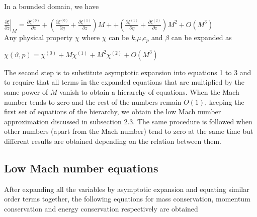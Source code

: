 \documentclass[11pt,a4paper]{article}
\begin{document}
In a bounded domain, we have

$\left. \frac{\partial \xi}{\partial z} \right|_M = \frac{\partial \xi^{(0)}}{\partial z} +\left(\frac{\partial \xi^{(0)}}{\partial\eta}+\frac{\partial\xi^{(1)}}{\partial z}\right)M+ +\left(\frac{\partial \xi^{(1)}}{\partial\eta}+\frac{\partial\xi^{(2)}}{\partial z}\right)M^2+O(M^3)$\\
Any physical property $\chi$ where $\chi$ can be $k$,$\mu$,$c_p$ and $\beta$ can be expanded as 

$\chi(\vartheta,p)=\chi^{(0)}+M\chi^{(1)}+M^2\chi^{(2)}+ O(M^3)$

The second step is to substitute asymptotic expansion into equations 1 to 3 and
to require that all terms in the expanded equations that are multiplied by
the same power of $M$ vanish to obtain a hierarchy of equations. When the
Mach number tends to zero and the rest of the numbers remain $O(1)$, keeping
the first set of equations of the hierarchy, we obtain the low Mach number
approximation discussed in subsection 2.3. The same procedure is followed
when other numbers (apart from the Mach number) tend to zero at the same
time but different results are obtained depending on the relation between them.
\subsection{Low Mach number equations}
After expanding all the variables by asymptotic expansion and equating similar order terms together, the following equations for mass conservation, momentum conservation and energy conservation respectively  are obtained 
\end{document}
